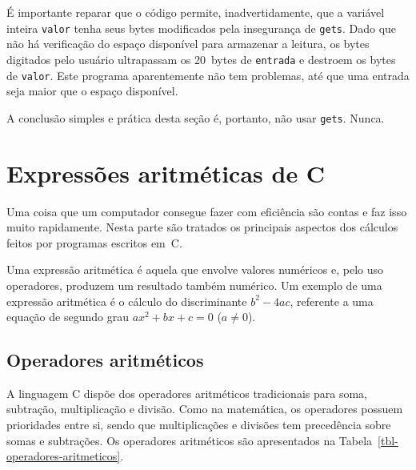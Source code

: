 \documentclass[
  11pt,
  a4paper,
]{scrbook}
\begin{document}
É importante reparar que o código permite, inadvertidamente, que a
variável inteira \texttt{valor} tenha seus bytes modificados pela
insegurança de \texttt{gets}. Dado que não há verificação do espaço
disponível para armazenar a leitura, os bytes digitados pelo usuário
ultrapassam os 20~bytes de \texttt{entrada} e destroem os bytes de
\texttt{valor}. Este programa aparentemente não tem problemas, até que
uma entrada seja maior que o espaço disponível.

A conclusão simples e prática desta seção é, portanto, não usar
\texttt{gets}. Nunca.

\chapter{Expressões aritméticas de
C}\label{expressuxf5es-aritmuxe9ticas-de-c}

Uma coisa que um computador consegue fazer com eficiência são contas e
faz isso muito rapidamente. Nesta parte são tratados os principais
aspectos dos cálculos feitos por programas escritos em~C.

Uma expressão aritmética é aquela que envolve valores numéricos e, pelo
uso operadores, produzem um resultado também numérico. Um exemplo de uma
expressão aritmética é o cálculo do discriminante \({b^2 - 4ac}\),
referente a uma equação de segundo grau \({ax^2 + bx + c = 0}\)
(\(a\neq 0\)).

\section{Operadores aritméticos}\label{operadores-aritmuxe9ticos}

A linguagem C dispõe dos operadores aritméticos tradicionais para soma,
subtração, multiplicação e divisão. Como na matemática, os operadores
possuem prioridades entre si, sendo que multiplicações e divisões tem
precedência sobre somas e subtrações. Os operadores aritméticos são
apresentados na Tabela~\ref{tbl-operadores-aritmeticos}.
\end{document}
